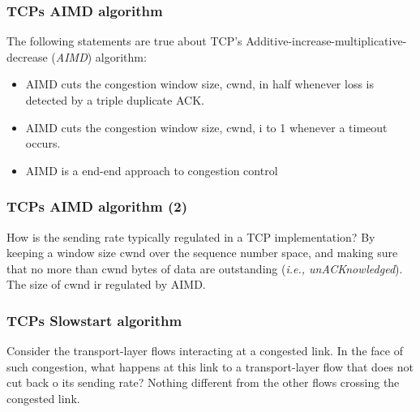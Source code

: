     \subsubsection*{TCPs AIMD algorithm}
    \noindent The following statements are true about TCP's Additive-increase-multiplicative-decrease (\textit{AIMD}) algorithm:
    \begin{itemize}
        \item AIMD cuts the congestion window size, cwnd, in half whenever loss is detected by a triple duplicate ACK.
        \item AIMD cuts the congestion window size, cwnd, i to 1 whenever a timeout occurs.
        \item AIMD is a end-end approach to congestion control
    \end{itemize}

    \subsubsection*{TCPs AIMD algorithm (2)}
    \noindent How is the sending rate typically regulated in a TCP implementation? By keeping a window size cwnd over the sequence number space, and making sure that no more than cwnd bytes of data
    are outstanding (\textit{i.e., unACKnowledged}). The size of cwnd ir regulated by AIMD.

    \subsubsection*{TCPs Slowstart algorithm}
    \noindent Consider the transport-layer flows interacting at a congested link. In the face of such congestion, what happens at this link to a transport-layer flow that does not cut back o its sending rate?
    Nothing different from the other flows crossing the congested link.